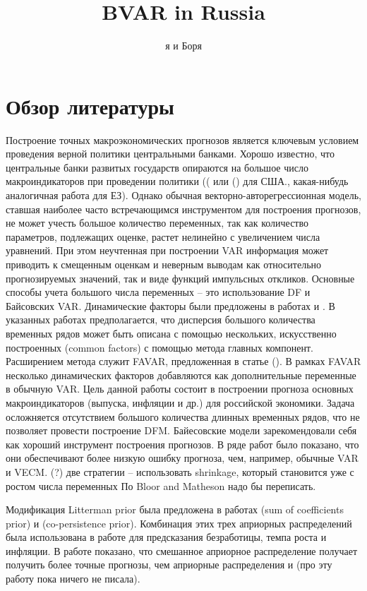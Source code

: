 \documentclass[11pt]{article} %
\title{BVAR in Russia}
\author{я и Боря}
\begin{document}
\maketitle

\section{Обзор литературы}

Построение точных  макроэкономических прогнозов является ключевым условием проведения верной политики центральными  банками.  Хорошо известно, что центральные банки развитых государств опираются на большое число макроиндикаторов при проведении политики ((\cite{stock_watson_2002_forecasting} или (\cite{bernanke_al_2005}) для США., какая-нибудь аналогичная работа для ЕЗ). Однако обычная векторно-авторегрессионная модель, ставшая наиболее часто встречающимся инструментом для построения прогнозов, не может учесть большое количество переменных, так как количество параметров, подлежащих оценке, растет нелинейно с увеличением числа уравнений.  При этом неучтенная при построении VAR информация может приводить к смещенным оценкам и  неверным выводам  как относительно прогнозируемых значений, так и виде функций импульсных откликов.  Основные способы учета большого числа переменных – это использование DF и Байсовских VAR.
Динамические факторы были предложены в работах \cite{forni_hallin_lippi_generalized} и \cite{stock_watson_2002_forecasting}.  В указанных работах предполагается, что дисперсия большого количества временных рядов может быть описана с помощью нескольких, искусственно построенных (common factors)  с помощью метода главных компонент.  Расширением метода\cite{stock_watson_2002_forecasting} служит FAVAR, предложенная в статье (\cite{bernanke_al_2005}). В рамках FAVAR несколько динамических факторов  добавляются как дополнительные переменные в обычную VAR.
Цель данной работы состоит в построении  прогноза основных макроиндикаторов (выпуска, инфляции и др.) для российской экономики.  Задача осложняется отсутствием  большого количества длинных временных рядов, что не позволяет провести построение DFM.
Байесовские модели зарекомендовали себя как хороший инструмент построения прогнозов. В ряде работ было показано, что они обеспечивают более низкую ошибку прогноза, чем, например, обычные VAR и VECM.
(?) две стратегии – использовать shrinkage, который становится уже с ростом числа переменных
По Bloor and Matheson надо бы переписать.


Модификация Litterman prior была предложена в работах \cite{doan_litterman_sims_1984_forecasting}  (sum of coefficients prior) и \cite{sims_1993_nine}    (co-persistence prior).  Комбинация этих трех априорных распределений была использована в работе \cite{robertson_tallman_1999_vector}  для предсказания безработицы, темпа роста  и инфляции. В работе показано, что смешанное априорное распределение получает получить более точные прогнозы, чем априорные распределения \cite{litterman1986forecasting} и \cite{sims_zha_1998_bayesian} (про эту работу пока ничего не писала).
\end{document}
